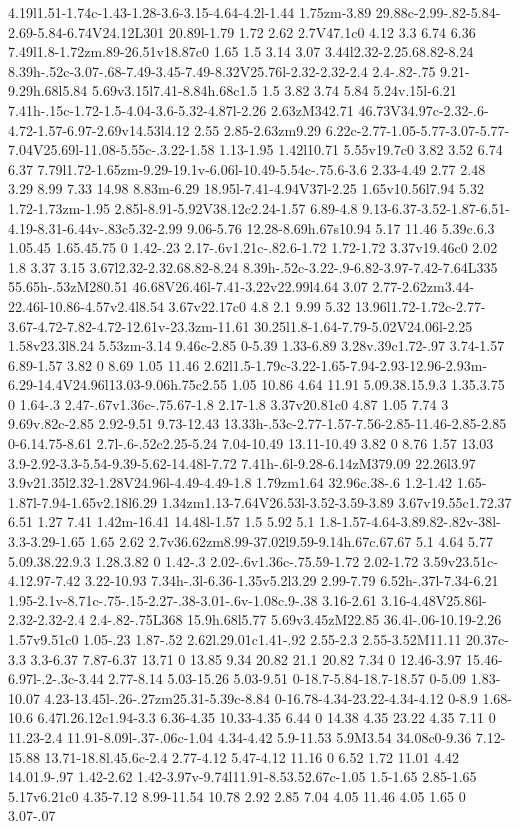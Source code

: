 {{{4.19l1.51-1.74c-1.43-1.28-3.6-3.15-4.64-4.2l-1.44 1.75zm-3.89 29.88c-2.99-.82-5.84-2.69-5.84-6.74V24.12L301 20.89l-1.79 1.72 2.62 2.7V47.1c0 4.12 3.3 6.74 6.36 7.49l1.8-1.72zm.89-26.51v18.87c0 1.65 1.5 3.14 3.07 3.44l2.32-2.25.68.82-8.24 8.39h-.52c-3.07-.68-7.49-3.45-7.49-8.32V25.76l-2.32-2.32-2.4 2.4-.82-.75 9.21-9.29h.68l5.84 5.69v3.15l7.41-8.84h.68c1.5 1.5 3.82 3.74 5.84 5.24v.15l-6.21 7.41h-.15c-1.72-1.5-4.04-3.6-5.32-4.87l-2.26 2.63zM342.71 46.73V34.97c-2.32-.6-4.72-1.57-6.97-2.69v14.53l4.12 2.55 2.85-2.63zm9.29 6.22c-2.77-1.05-5.77-3.07-5.77-7.04V25.69l-11.08-5.55c-.3.22-1.58 1.13-1.95 1.42l10.71 5.55v19.7c0 3.82 3.52 6.74 6.37 7.79l1.72-1.65zm-9.29-19.1v-6.06l-10.49-5.54c-.75.6-3.6 2.33-4.49 2.77 2.48 3.29 8.99 7.33 14.98 8.83m-6.29 18.95l-7.41-4.94V37l-2.25 1.65v10.56l7.94 5.32 1.72-1.73zm-1.95 2.85l-8.91-5.92V38.12c2.24-1.57 6.89-4.8 9.13-6.37-3.52-1.87-6.51-4.19-8.31-6.44v-.83c5.32-2.99 9.06-5.76 12.28-8.69h.67s10.94 5.17 11.46 5.39c.6.3 1.05.45 1.65.45.75 0 1.42-.23 2.17-.6v1.21c-.82.6-1.72 1.72-1.72 3.37v19.46c0 2.02 1.8 3.37 3.15 3.67l2.32-2.32.68.82-8.24 8.39h-.52c-3.22-.9-6.82-3.97-7.42-7.64L335 55.65h-.53zM280.51 46.68V26.46l-7.41-3.22v22.99l4.64 3.07 2.77-2.62zm3.44-22.46l-10.86-4.57v2.4l8.54 3.67v22.17c0 4.8 2.1 9.99 5.32 13.96l1.72-1.72c-2.77-3.67-4.72-7.82-4.72-12.61v-23.3zm-11.61 30.25l1.8-1.64-7.79-5.02V24.06l-2.25 1.58v23.3l8.24 5.53zm-3.14 9.46c-2.85 0-5.39 1.33-6.89 3.28v.39c1.72-.97 3.74-1.57 6.89-1.57 3.82 0 8.69 1.05 11.46 2.62l1.5-1.79c-3.22-1.65-7.94-2.93-12.96-2.93m-6.29-14.4V24.96l13.03-9.06h.75c2.55 1.05 10.86 4.64 11.91 5.09.38.15.9.3 1.35.3.75 0 1.64-.3 2.47-.67v1.36c-.75.67-1.8 2.17-1.8 3.37v20.81c0 4.87 1.05 7.74 3 9.69v.82c-2.85 2.92-9.51 9.73-12.43 13.33h-.53c-2.77-1.57-7.56-2.85-11.46-2.85-2.85 0-6.14.75-8.61 2.7l-.6-.52c2.25-5.24 7.04-10.49 13.11-10.49 3.82 0 8.76 1.57 13.03 3.9-2.92-3.3-5.54-9.39-5.62-14.48l-7.72 7.41h-.6l-9.28-6.14zM379.09 22.26l3.97 3.9v21.35l2.32-1.28V24.96l-4.49-4.49-1.8 1.79zm1.64 32.96c.38-.6 1.2-1.42 1.65-1.87l-7.94-1.65v2.18l6.29 1.34zm1.13-7.64V26.53l-3.52-3.59-3.89 3.67v19.55c1.72.37 6.51 1.27 7.41 1.42m-16.41 14.48l-1.57 1.5 5.92 5.1 1.8-1.57-4.64-3.89.82-.82v-38l-3.3-3.29-1.65 1.65 2.62 2.7v36.62zm8.99-37.02l9.59-9.14h.67c.67.67 5.1 4.64 5.77 5.09.38.22.9.3 1.28.3.82 0 1.42-.3 2.02-.6v1.36c-.75.59-1.72 2.02-1.72 3.59v23.51c-4.12.97-7.42 3.22-10.93 7.34h-.3l-6.36-1.35v5.2l3.29 2.99-7.79 6.52h-.37l-7.34-6.21 1.95-2.1v-8.71c-.75-.15-2.27-.38-3.01-.6v-1.08c.9-.38 3.16-2.61 3.16-4.48V25.86l-2.32-2.32-2.4 2.4-.82-.75L368 15.9h.68l5.77 5.69v3.45zM22.85 36.4l-.06-10.19-2.26 1.57v9.51c0 1.05-.23 1.87-.52 2.62l.29.01c1.41-.92 2.55-2.3 2.55-3.52M11.11 20.37c-3.3 3.3-6.37 7.87-6.37 13.71 0 13.85 9.34 20.82 21.1 20.82 7.34 0 12.46-3.97 15.46-6.97l-.2-.3c-3.44 2.77-8.14 5.03-15.26 5.03-9.51 0-18.7-5.84-18.7-18.57 0-5.09 1.83-10.07 4.23-13.45l-.26-.27zm25.31-5.39c-8.84 0-16.78-4.34-23.22-4.34-4.12 0-8.9 1.68-10.6 6.47l.26.12c1.94-3.3 6.36-4.35 10.33-4.35 6.44 0 14.38 4.35 23.22 4.35 7.11 0 11.23-2.4 11.91-8.09l-.37-.06c-1.04 4.34-4.42 5.9-11.53 5.9M3.54 34.08c0-9.36 7.12-15.88 13.71-18.8l.45.6c-2.4 2.77-4.12 5.47-4.12 11.16 0 6.52 1.72 11.01 4.42 14.01.9-.97 1.42-2.62 1.42-3.97v-9.74l11.91-8.53.52.67c-1.05 1.5-1.65 2.85-1.65 5.17v6.21c0 4.35-7.12 8.99-11.54 10.78 2.92 2.85 7.04 4.05 11.46 4.05 1.65 0 3.07-.07 }}}
